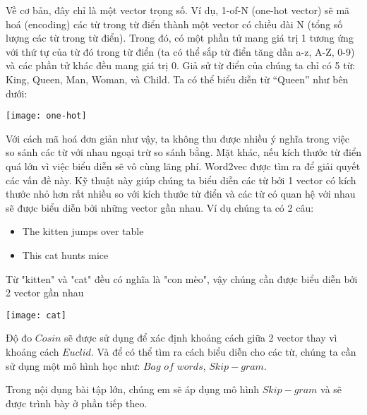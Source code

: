 Về cơ bản, đây chỉ là một vector trọng số. Ví dụ, 1-of-N (one-hot vector) sẽ mã hoá (encoding) các từ trong từ điển thành một vector có chiều dài N (tổng số lượng các từ trong từ điển). Trong đó, có một phần tử mang giá trị 1 tương ứng với thứ tự của từ đó trong từ điển (ta có thể sắp từ điển tăng dần a-z, A-Z, 0-9) và các phần tử khác đều mang giá trị 0. Giả sử từ điển của chúng ta chỉ có 5 từ: King, Queen, Man, Woman, và Child. Ta có thể biểu diễn từ “Queen” như bên dưới:
	\begin{center}
	  \texttt{[image: one-hot]}
	  \label{one-hot}
	\end{center} 
Với cách mã hoá đơn giản như vậy, ta không thu được nhiều ý nghĩa trong việc so sánh các từ với nhau ngoại trừ so sánh bằng. Mặt khác, nếu kích thước từ điển quá lớn vì việc biểu diễn sẽ vô cùng lãng phí.
Word2vec được tìm ra để giải quyết các vấn đề này. Kỹ thuật này giúp chúng ta biểu diễn các từ bởi 1 vector có kích thước nhỏ hơn rất nhiều so với kích thước từ điển và các từ có quan hệ với nhau sẽ được biểu diễn bởi những vector gần nhau. Ví dụ chúng ta có 2 câu:
	\begin{itemize}[label = \textbullet]
		\item The kitten jumps over table
		\item This cat hunts mice
	\end{itemize}
Từ "kitten" và "cat" đều có nghĩa là "con mèo", vậy chúng cần được biểu diễn bởi 2 vector gần nhau
	\begin{center}
	  \texttt{[image: cat]}
	  \label{cosin}
	\end{center} 
Độ đo $Cosin$ sẽ được sử dụng để xác định khoảng cách giữa 2 vector thay vì khoảng cách $Euclid$. Và để có thể tìm ra cách biểu diễn cho các từ, chúng ta cần sử dụng một mô hình học như: $Bag$ $of$ $words$, $Skip-gram$.

Trong nội dụng bài tập lớn, chúng em sẽ áp dụng mô hình $Skip-gram$ và sẽ được trình bày ở phần tiếp theo.
